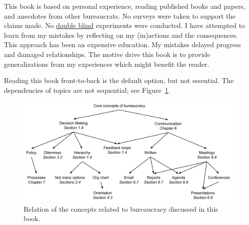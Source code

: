 This book is based on personal experience, reading published books and papers, and anecdotes from other bureaucrats. No surveys were taken to support the claims made. No \href{https://en.wikipedia.org/wiki/Blinded_experiment}{double blind} experiments were conducted. 
I have attempted to learn from my mistakes by reflecting on my (in)actions and the consequences. This approach has been an expensive education. My mistakes delayed progress and damaged relationships. The motive drive this book is to provide generalizations from my experiences which might benefit the reader.


Reading this book front-to-back is the default option, but not essential. The dependencies of topics are not sequential; see Figure~\ref{fig:core-concepts}.

\begin{figure}[ht]
    \centering
    \includegraphics[width=1\textwidth]{images/core_concepts_map.pdf}
    \caption{Relation of the concepts related to bureaucracy discussed in this book. }
    \label{fig:core-concepts}
\end{figure}



